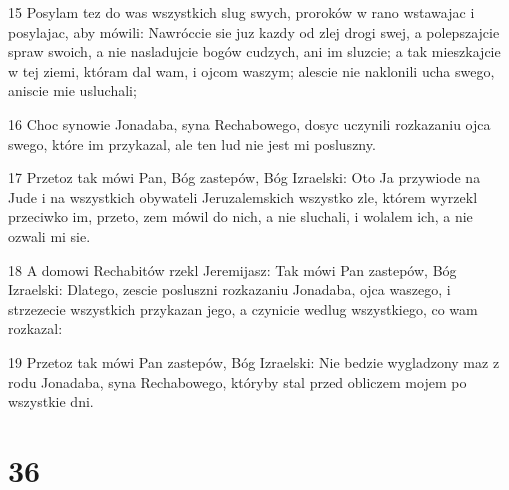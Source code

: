 \par 15 Posylam tez do was wszystkich slug swych, proroków w rano wstawajac i posylajac, aby mówili: Nawróccie sie juz kazdy od zlej drogi swej, a polepszajcie spraw swoich, a nie nasladujcie bogów cudzych, ani im sluzcie; a tak mieszkajcie w tej ziemi, któram dal wam, i ojcom waszym; alescie nie naklonili ucha swego, aniscie mie usluchali;
\par 16 Choc synowie Jonadaba, syna Rechabowego, dosyc uczynili rozkazaniu ojca swego, które im przykazal, ale ten lud nie jest mi posluszny.
\par 17 Przetoz tak mówi Pan, Bóg zastepów, Bóg Izraelski: Oto Ja przywiode na Jude i na wszystkich obywateli Jeruzalemskich wszystko zle, którem wyrzekl przeciwko im, przeto, zem mówil do nich, a nie sluchali, i wolalem ich, a nie ozwali mi sie.
\par 18 A domowi Rechabitów rzekl Jeremijasz: Tak mówi Pan zastepów, Bóg Izraelski: Dlatego, zescie posluszni rozkazaniu Jonadaba, ojca waszego, i strzezecie wszystkich przykazan jego, a czynicie wedlug wszystkiego, co wam rozkazal:
\par 19 Przetoz tak mówi Pan zastepów, Bóg Izraelski: Nie bedzie wygladzony maz z rodu Jonadaba, syna Rechabowego, któryby stal przed obliczem mojem po wszystkie dni.

\chapter{36}

